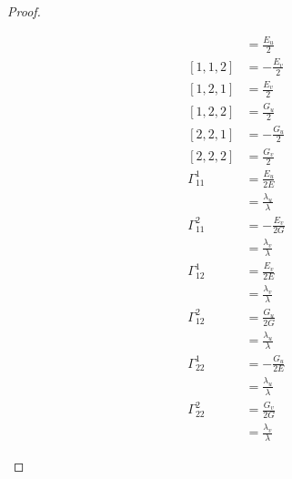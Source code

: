 \documentclass[10pt,a4paper]{article}
\begin{document}
\begin{proof}
\begin{enumerate}
\begin{align*}
[1,1,1]&=\frac{E_u}{2}\\
[1,1,2]&=-\frac{E_v}{2}\\
[1,2,1]&=\frac{E_v}{2}\\
[1,2,2]&=\frac{G_u}{2}\\
[2,2,1]&=-\frac{G_u}{2}\\
[2,2,2]&=\frac{G_v}{2}\\
\Gamma_{11}^1&=\frac{E_u}{2E}\\
&=\frac{\lambda_u}{\lambda}\\
\Gamma_{11}^2&=-\frac{E_v}{2G}\\
&=\frac{\lambda_v}{\lambda}\\
\Gamma_{12}^1&=\frac{E_v}{2E}\\
&=\frac{\lambda_v}{\lambda}\\
\Gamma_{12}^2&=\frac{G_u}{2G}\\
&=\frac{\lambda_u}{\lambda}\\
\Gamma_{22}^1&=-\frac{G_u}{2E}\\
&=\frac{\lambda_u}{\lambda}\\
\Gamma_{22}^2&=\frac{G_v}{2G}\\
&=\frac{\lambda_v}{\lambda}
\end{align*}
\end{enumerate}
\end{proof}
\end{document}
